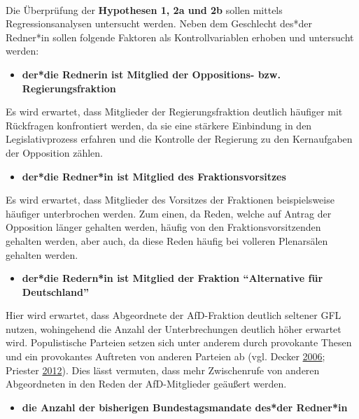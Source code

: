 \documentclass[12pt,ngerman,]{article}
\providecommand{\tightlist}{%
\setlength{\itemsep}{0pt}\setlength{\parskip}{0pt}}
\begin{document}
~

Die Überprüfung der \textbf{Hypothesen 1, 2a und 2b} sollen mittels
Regressionsanalysen untersucht werden. Neben dem Geschlecht des*der
Redner*in sollen folgende Faktoren als Kontrollvariablen erhoben und
untersucht werden:

\begin{itemize}
\tightlist
\item
  \textbf{der*die Rednerin ist Mitglied der Oppositions- bzw.
  Regierungsfraktion}
\end{itemize}

Es wird erwartet, dass Mitglieder der Regierungsfraktion deutlich
häufiger mit Rückfragen konfrontiert werden, da sie eine stärkere
Einbindung in den Legislativprozess erfahren und die Kontrolle der
Regierung zu den Kernaufgaben der Opposition zählen.

\begin{itemize}
\tightlist
\item
  \textbf{der*die Redner*in ist Mitglied des Fraktionsvorsitzes}
\end{itemize}

Es wird erwartet, dass Mitglieder des Vorsitzes der Fraktionen
beispielsweise häufiger unterbrochen werden. Zum einen, da Reden, welche
auf Antrag der Opposition länger gehalten werden, häufig von den
Fraktionsvorsitzenden gehalten werden, aber auch, da diese Reden häufig
bei volleren Plenarsälen gehalten werden.

\begin{itemize}
\tightlist
\item
  \textbf{der*die Redern*in ist Mitglied der Fraktion
  \enquote{Alternative für Deutschland}}
\end{itemize}

Hier wird erwartet, dass Abgeordnete der AfD-Fraktion deutlich seltener
GFL nutzen, wohingehend die Anzahl der Unterbrechungen deutlich höher
erwartet wird. Populistische Parteien setzen sich unter anderem durch
provokante Thesen und ein provokantes Auftreten von anderen Parteien ab
(vgl. Decker \protect\hyperlink{ref-decker_populismus_2006}{2006};
Priester \protect\hyperlink{ref-priester_2012}{2012}). Dies lässt
vermuten, dass mehr Zwischenrufe von anderen Abgeordneten in den Reden
der AfD-Mitglieder geäußert werden.

\begin{itemize}
\tightlist
\item
  \textbf{die Anzahl der bisherigen Bundestagsmandate des*der Redner*in}
\end{itemize}
\end{document}
